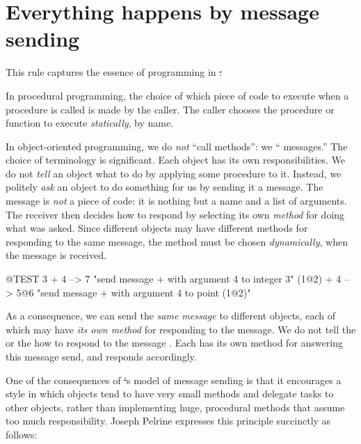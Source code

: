 \documentclass[a4paper,10pt,twoside]{book}
\begin{document}
\section{Everything happens by message sending}


This rule captures the essence of programming in \st.

In procedural programming, the choice of which piece of code to execute when a procedure is called is made by the caller.
The caller chooses the procedure or function to execute \emph{statically}, by name.  

In object-oriented programming, we do \emph{not} ``call methods'': we `` messages.''
The choice of terminology is significant.
Each object has its own responsibilities.
We do not \emph{tell} an object what to do by applying some procedure to it.
Instead, we politely \emph{ask} an object to do something for us by sending it a message.
The message is \emph{not} a piece of code: it is nothing but a name and a list of arguments.
The receiver then decides how to respond by selecting its own \emph{method} for doing what was asked.
Since different objects may have different methods for responding to the same message, the method must be chosen \emph{dynamically}, when the message is received.
\begin{code}{@TEST}
3 + 4         --> 7          "send message + with argument 4 to integer  3"
(1@2) + 4 --> 5@6    "send message + with argument 4 to point (1@2)"
\end{code}
\noindent
As a consequence, we can send the \emph{same message} to different objects, each of which may have \emph{its own method} for responding to the message.
We do not tell the   or the   how to respond to the message .
Each has its own method for answering this message send, and responds accordingly.

One of the consequences of \st's model of message sending is that it encourages a style in which objects tend to have very small methods and delegate tasks to other objects, rather than implementing huge, procedural methods that assume too much responsibility.
Joseph Pelrine
expresses this principle succinctly as follows:
\end{document}
